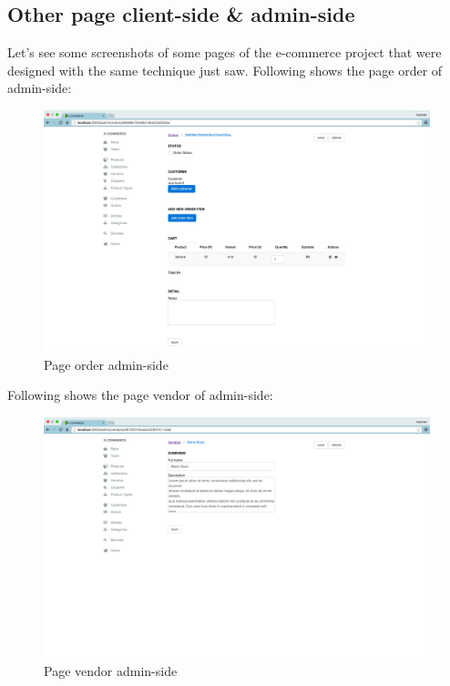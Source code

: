 \subsection{Other page client-side \& admin-side}
Let's see some screenshots of some pages of the e-commerce project that were designed with the same technique just saw.
\newline
Following shows the page order of admin-side:
\begin{figure}[htb]
\centering
\includegraphics[width=1.0\linewidth]{images/chapter4/page-order-all.png}\hfill
\caption[page order admin-side]{Page order admin-side}
\label{fig:page_order_admin_side}
\end{figure}
\newline
Following shows the page vendor of admin-side:
\begin{figure}[htb]
\centering
\includegraphics[width=1.0\linewidth]{images/chapter4/page-vendor-all.png}\hfill
\caption[page vendor admin-side]{Page vendor admin-side}
\label{fig:page_vendor_admin_side}
\end{figure}
